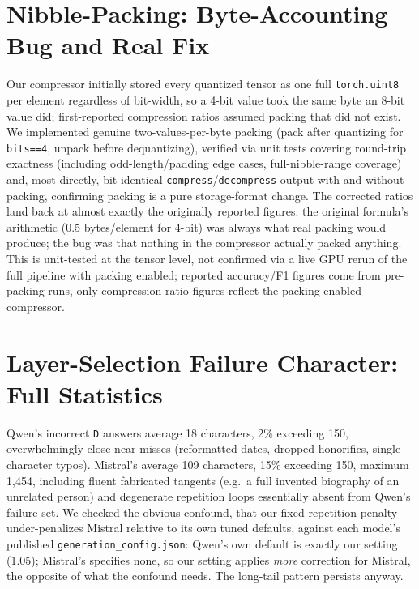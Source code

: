 \documentclass[11pt]{article}
\begin{document}
\section{Nibble-Packing: Byte-Accounting Bug and Real Fix}
\label{app:nibble}

Our compressor initially stored every quantized tensor as one full
\texttt{torch.uint8} per element regardless of bit-width, so a 4-bit
value took the same byte an 8-bit value did; first-reported compression
ratios assumed packing that did not exist. We implemented genuine
two-values-per-byte packing (pack after quantizing for \texttt{bits==4},
unpack before dequantizing), verified via unit tests covering
round-trip exactness (including odd-length/padding edge cases,
full-nibble-range coverage) and, most directly, bit-identical
\texttt{compress}/\texttt{decompress} output with and without packing,
confirming packing is a pure storage-format change. The corrected
ratios land back at almost exactly the originally reported figures: the
original formula's arithmetic (0.5 bytes/element for 4-bit) was always
what real packing would produce; the bug was that nothing in the
compressor actually packed anything. This is unit-tested at the tensor
level, not confirmed via a live GPU rerun of the full pipeline with
packing enabled; reported accuracy/F1 figures come from pre-packing
runs, only compression-ratio figures reflect the packing-enabled
compressor.

\section{Layer-Selection Failure Character: Full Statistics}
\label{app:failurechar}

Qwen's incorrect \texttt{D} answers average 18 characters, 2\%
exceeding 150, overwhelmingly close near-misses (reformatted dates,
dropped honorifics, single-character typos). Mistral's average 109
characters, 15\% exceeding 150, maximum 1,454, including fluent
fabricated tangents (e.g.\ a full invented biography of an unrelated
person) and degenerate repetition loops essentially absent from Qwen's
failure set. We checked the obvious confound, that our fixed
repetition penalty under-penalizes Mistral relative to its own tuned
defaults, against each model's published \texttt{generation\_config.json}:
Qwen's own default is exactly our setting (1.05); Mistral's specifies
none, so our setting applies \emph{more} correction for Mistral, the
opposite of what the confound needs. The long-tail pattern persists
anyway.
\end{document}
